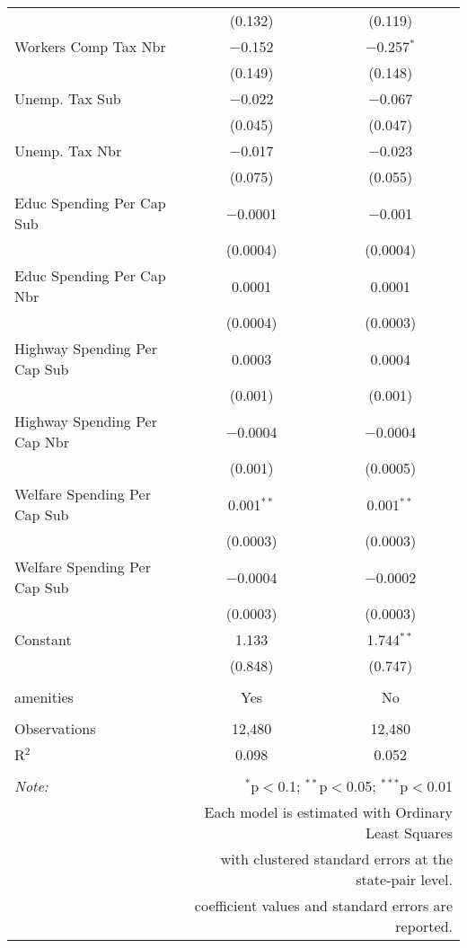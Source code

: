 \begin{table}[!htbp]
\begin{tabular}{@{\extracolsep{5pt}}lcc}
  & (0.132) & (0.119) \\ 
  Workers Comp Tax Nbr & $-$0.152 & $-$0.257$^{*}$ \\ 
  & (0.149) & (0.148) \\ 
  Unemp. Tax Sub & $-$0.022 & $-$0.067 \\ 
  & (0.045) & (0.047) \\ 
  Unemp. Tax Nbr & $-$0.017 & $-$0.023 \\ 
  & (0.075) & (0.055) \\ 
  Educ Spending Per Cap Sub & $-$0.0001 & $-$0.001 \\ 
  & (0.0004) & (0.0004) \\ 
  Educ Spending Per Cap Nbr & 0.0001 & 0.0001 \\ 
  & (0.0004) & (0.0003) \\ 
  Highway Spending Per Cap Sub & 0.0003 & 0.0004 \\ 
  & (0.001) & (0.001) \\ 
  Highway Spending Per Cap Nbr & $-$0.0004 & $-$0.0004 \\ 
  & (0.001) & (0.0005) \\ 
  Welfare Spending Per Cap Sub & 0.001$^{**}$ & 0.001$^{**}$ \\ 
  & (0.0003) & (0.0003) \\ 
  Welfare Spending Per Cap Sub & $-$0.0004 & $-$0.0002 \\ 
  & (0.0003) & (0.0003) \\ 
  Constant & 1.133 & 1.744$^{**}$ \\ 
  & (0.848) & (0.747) \\ 
 \hline \\[-1.8ex] 
amenities & Yes & No \\ 
\hline \\[-1.8ex] 
Observations & 12,480 & 12,480 \\ 
R$^{2}$ & 0.098 & 0.052 \\ 
\hline 
\hline \\[-1.8ex] 
\textit{Note:}  & \multicolumn{2}{r}{$^{*}$p$<$0.1; $^{**}$p$<$0.05; $^{***}$p$<$0.01} \\ 
 & \multicolumn{2}{r}{Each model is estimated with Ordinary Least Squares} \\ 
 & \multicolumn{2}{r}{with clustered standard errors at the state-pair level.} \\ 
 & \multicolumn{2}{r}{coefficient values and standard errors are reported.} \\ 
\end{tabular} 
\end{table} 

